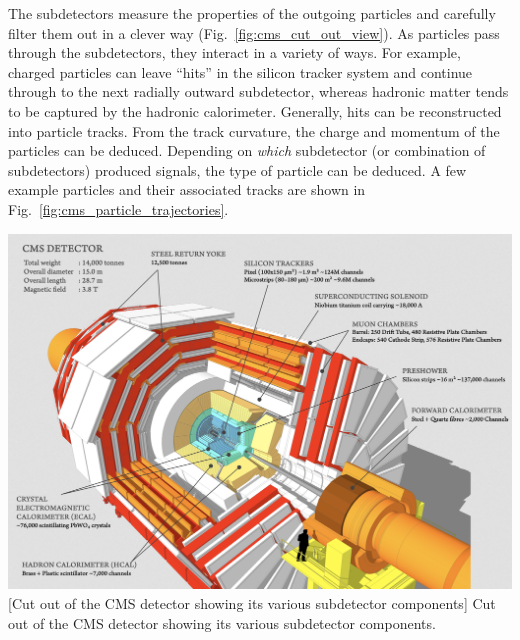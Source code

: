 The subdetectors measure the properties of the outgoing particles and carefully filter them out in a clever way (Fig.~\ref{fig:cms_cut_out_view}).
As particles pass through the subdetectors, they interact in a variety of ways.
For example, charged particles can leave ``hits'' in the silicon tracker system and continue through to the next radially outward subdetector, whereas hadronic matter tends to be captured by the hadronic calorimeter.
Generally, hits can be reconstructed into particle tracks.
From the track curvature, the charge and momentum of the particles can be deduced.
Depending on \emph{which} subdetector (or combination of subdetectors) produced signals, the type of particle can be deduced.
A few example particles and their associated tracks are shown in Fig.~\ref{fig:cms_particle_trajectories}.
\begin{multiFigure}
    \centering
    \includegraphics[width=\textwidth,keepaspectratio]{figures/cms/cms_cut_away.png}
        [Cut out of the CMS detector showing its various subdetector components]
        {Cut out of the CMS detector showing its various subdetector components.}
    \label{fig:cms_cut_out_view}
\end{multiFigure}

